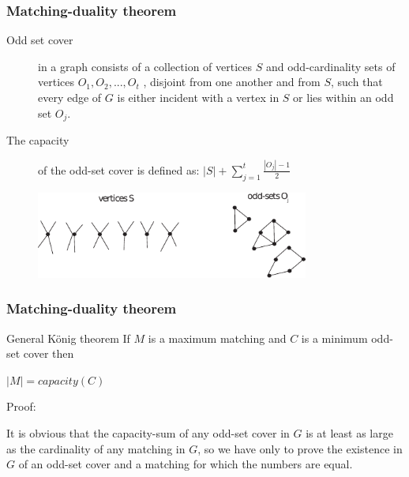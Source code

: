 \documentclass[hyperref={pdfpagelabels=false}]{beamer}
\begin{document}
\frame
{
	\frametitle{Matching-duality theorem}
	
	\begin{description}
	\item[Odd set cover] in a graph consists of a collection of vertices $S$ and odd-cardinality sets of vertices
$O_{1} , O_{2} , ..., O_{t}$ , disjoint from one another and from $S$, such that every edge of $G$ is either
incident with a vertex in $S$ or lies within an odd set $O_{j}$.
	\item[The capacity] of the odd-set cover is defined as: $|S| + \sum\limits_{j=1}^{t} \frac{|O_{j}| - 1}{2}$
	\end{description}
	
	\begin{figure}[htb]
	\centering
	\includegraphics[width=0.8\textwidth]{figures/oddset.pdf}
	\end{figure}
}

\frame
{
	\frametitle{Matching-duality theorem}
	
	\begin{block}{General K\"{o}nig theorem}
		If $M$ is a maximum matching and $C$ is a minimum odd-set cover then
		\begin{center}
		$|M| = capacity(C)$
		\end{center}
	\end{block}
	
	\begin{itemize}
	{
		\item Proof:
		
		\bigskip
		
		It is obvious that the capacity-sum of any odd-set cover in $G$ is at least as large as the cardinality of any matching in $G$, so we have only to prove the existence in $G$ of an odd-set cover and a matching for which the numbers are equal.
	}
	\end{itemize}
}
\end{document}
